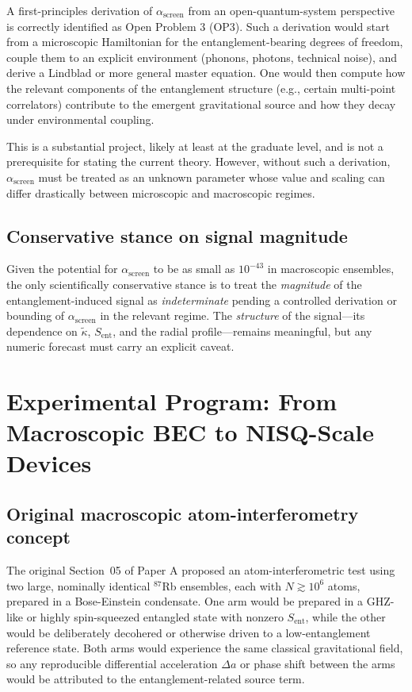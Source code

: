 \documentclass[11pt]{article}
\begin{document}
A first-principles derivation of $\alpha_{\text{screen}}$ from an open-quantum-system perspective is correctly identified as Open Problem 3 (OP3). Such a derivation would start from a microscopic Hamiltonian for the entanglement-bearing degrees of freedom, couple them to an explicit environment (phonons, photons, technical noise), and derive a Lindblad or more general master equation. One would then compute how the relevant components of the entanglement structure (e.g., certain multi-point correlators) contribute to the emergent gravitational source and how they decay under environmental coupling.

This is a substantial project, likely at least at the graduate level, and is not a prerequisite for stating the current theory. However, without such a derivation, $\alpha_{\text{screen}}$ must be treated as an unknown parameter whose value and scaling can differ drastically between microscopic and macroscopic regimes.

\subsection{Conservative stance on signal magnitude}

Given the potential for $\alpha_{\text{screen}}$ to be as small as $10^{-43}$ in macroscopic ensembles, the only scientifically conservative stance is to treat the \emph{magnitude} of the entanglement-induced signal as \emph{indeterminate} pending a controlled derivation or bounding of $\alpha_{\text{screen}}$ in the relevant regime. The \emph{structure} of the signal---its dependence on $\tilde{\kappa}$, $S_{\text{ent}}$, and the radial profile---remains meaningful, but any numeric forecast must carry an explicit caveat.

\section{Experimental Program: From Macroscopic BEC to NISQ-Scale Devices}

\subsection{Original macroscopic atom-interferometry concept}

The original Section~05 of Paper A proposed an atom-interferometric test using two large, nominally identical $^{87}$Rb ensembles, each with $N\gtrsim 10^6$ atoms, prepared in a Bose-Einstein condensate. One arm would be prepared in a GHZ-like or highly spin-squeezed entangled state with nonzero $S_{\text{ent}}$, while the other would be deliberately decohered or otherwise driven to a low-entanglement reference state. Both arms would experience the same classical gravitational field, so any reproducible differential acceleration $\Delta a$ or phase shift between the arms would be attributed to the entanglement-related source term.
\end{document}
